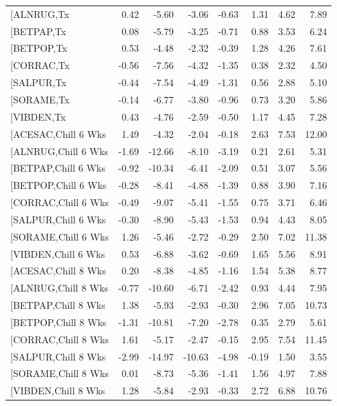 \documentclass{article}\usepackage[]{graphicx}\usepackage[]{color}
\begin{document}
\begin{longtable}{lrrrrrrr}
  [ALNRUG,Tx & 0.42 & -5.60 & -3.06 & -0.63 & 1.31 & 4.62 & 7.89 \\ 
  [BETPAP,Tx & 0.08 & -5.79 & -3.25 & -0.71 & 0.88 & 3.53 & 6.24 \\ 
  [BETPOP,Tx & 0.53 & -4.48 & -2.32 & -0.39 & 1.28 & 4.26 & 7.61 \\ 
  [CORRAC,Tx & -0.56 & -7.56 & -4.32 & -1.35 & 0.38 & 2.32 & 4.50 \\ 
  [SALPUR,Tx & -0.44 & -7.54 & -4.49 & -1.31 & 0.56 & 2.88 & 5.10 \\ 
  [SORAME,Tx & -0.14 & -6.77 & -3.80 & -0.96 & 0.73 & 3.20 & 5.86 \\ 
  [VIBDEN,Tx & 0.43 & -4.76 & -2.59 & -0.50 & 1.17 & 4.45 & 7.28 \\ 
  [ACESAC,Chill 6 Wks & 1.49 & -4.32 & -2.04 & -0.18 & 2.63 & 7.53 & 12.00 \\ 
  [ALNRUG,Chill 6 Wks & -1.69 & -12.66 & -8.10 & -3.19 & 0.21 & 2.61 & 5.31 \\ 
  [BETPAP,Chill 6 Wks & -0.92 & -10.34 & -6.41 & -2.09 & 0.51 & 3.07 & 5.56 \\ 
  [BETPOP,Chill 6 Wks & -0.28 & -8.41 & -4.88 & -1.39 & 0.88 & 3.90 & 7.16 \\ 
  [CORRAC,Chill 6 Wks & -0.49 & -9.07 & -5.41 & -1.55 & 0.75 & 3.71 & 6.46 \\ 
  [SALPUR,Chill 6 Wks & -0.30 & -8.90 & -5.43 & -1.53 & 0.94 & 4.43 & 8.05 \\ 
  [SORAME,Chill 6 Wks & 1.26 & -5.46 & -2.72 & -0.29 & 2.50 & 7.02 & 11.38 \\ 
  [VIBDEN,Chill 6 Wks & 0.53 & -6.88 & -3.62 & -0.69 & 1.65 & 5.56 & 8.91 \\ 
  [ACESAC,Chill 8 Wks & 0.20 & -8.38 & -4.85 & -1.16 & 1.54 & 5.38 & 8.77 \\ 
  [ALNRUG,Chill 8 Wks & -0.77 & -10.60 & -6.71 & -2.42 & 0.93 & 4.44 & 7.95 \\ 
  [BETPAP,Chill 8 Wks & 1.38 & -5.93 & -2.93 & -0.30 & 2.96 & 7.05 & 10.73 \\ 
  [BETPOP,Chill 8 Wks & -1.31 & -10.81 & -7.20 & -2.78 & 0.35 & 2.79 & 5.61 \\ 
  [CORRAC,Chill 8 Wks & 1.61 & -5.17 & -2.47 & -0.15 & 2.95 & 7.54 & 11.45 \\ 
  [SALPUR,Chill 8 Wks & -2.99 & -14.97 & -10.63 & -4.98 & -0.19 & 1.50 & 3.55 \\ 
  [SORAME,Chill 8 Wks & 0.01 & -8.73 & -5.36 & -1.41 & 1.56 & 4.97 & 7.88 \\ 
  [VIBDEN,Chill 8 Wks & 1.28 & -5.84 & -2.93 & -0.33 & 2.72 & 6.88 & 10.76 \\ 

\end{longtable}
\end{document}
